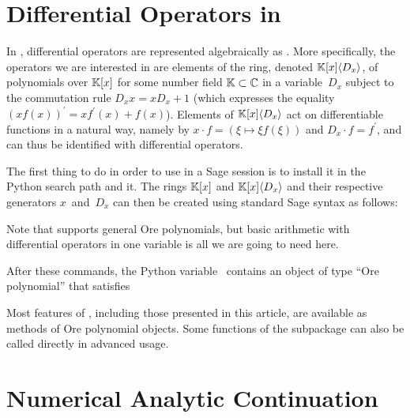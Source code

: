 \documentclass[runningheads,a4paper]{llncs}
\begin{document}
\section{Differential Operators in }

In , differential operators are represented
algebraically as {}. More specifically, the operators we
are interested in are elements of the ring, denoted $\mathbbm{K} [x] \langle
D_x \rangle$, of polynomials over $\mathbbm{K} [x]$ for some number field
$\mathbbm{K} \subset \mathbbm{C}$ in a variable~$D_x$ subject to the
commutation rule $D_x x = xD_x + 1$ (which expresses the equality $(xf
(x))^{\prime} = xf^{\prime} (x) + f (x)$). Elements of $\mathbbm{K} [x]
\langle D_x \rangle$ act on differentiable functions in a natural way, namely
by $x \cdot f = (\xi \mapsto \xi f (\xi))$ and $D_x \cdot f = f^{\prime}$, and
can thus be identified with differential operators.

The first thing to do in order to use  in a Sage
session is to install it in the Python search path and  it.
The rings $\mathbbm{K} [x]$ and $\mathbbm{K} [x] \langle D_x \rangle$ and
their respective generators $x$~and~$D_x$ can then be created using standard
Sage syntax as follows:


{\noindent}Note that  supports general Ore polynomials,
but basic arithmetic with differential operators in one variable is all we are
going to need here.

After these commands, the Python variable~ contains an object of
type ``Ore polynomial'' that satisfies


{\noindent}Most features of , including those presented
in this article, are available as methods of Ore polynomial objects. Some
functions of the  subpackage can also be called directly in
advanced usage.

\section{Numerical Analytic Continuation}
\end{document}
